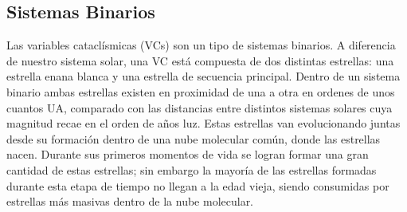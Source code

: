 \subsection*{Sistemas Binarios}

Las variables cataclísmicas (VCs) son un tipo de sistemas binarios. A diferencia
de nuestro sistema solar, una VC está compuesta de dos distintas estrellas: una
estrella enana blanca y una estrella de secuencia principal. Dentro de un
sistema binario ambas estrellas existen en proximidad de una a otra en ordenes
de unos cuantos UA, comparado con las distancias entre distintos sistemas
solares cuya magnitud recae en el orden de años luz. Estas estrellas van
evolucionando juntas desde su formación dentro de una nube molecular común,
donde las estrellas nacen. Durante sus primeros momentos de vida se logran
formar una gran cantidad de estas estrellas; sin embargo la mayoría de las
estrellas formadas durante esta etapa de tiempo no llegan a la edad vieja,
siendo consumidas por estrellas más masivas dentro de la nube molecular. 